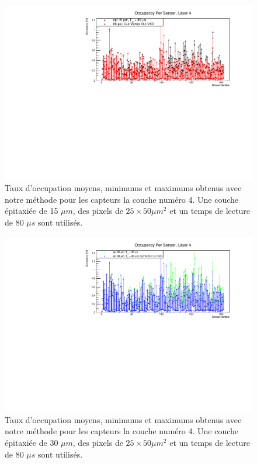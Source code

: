 \begin{appendices}
  \begin{figure}[!htb]
    \begin{center}
      \includegraphics[scale=0.80]{./figures/sensors_Readout_Time/resultOccupancyPerSensor/occupancyPerSensor_Layer4_epi_15um_Min_Max.pdf}
      \caption{Taux d'occupation moyens, minimums et maximums obtenus avec notre m\'ethode pour les capteurs la couche num\'ero 4. Une couche \'epitaxi\'ee de 15 $\mu m$, des pixels de $25 \times 50 \mu m^2$ et un temps de lecture de 80 $\mu s$ sont utilis\'es.}
      \label{fig:OccupancyLayer4_epi15um_Min_Max}
    \end{center}
  \end{figure}
  
  \begin{figure}[!htb]
    \begin{center}
      \includegraphics[scale=0.80]{./figures/sensors_Readout_Time/resultOccupancyPerSensor/occupancyPerSensor_Layer4_epi_30um_Min_Max.pdf}
      \caption{Taux d'occupation moyens, minimums et maximums obtenus avec notre m\'ethode pour les capteurs la couche num\'ero 4. Une couche \'epitaxi\'ee de 30 $\mu m$, des pixels de $25 \times 50 \mu m^2$ et un temps de lecture de 80 $\mu s$ sont utilis\'es.}
      \label{fig:OccupancyLayer4_epi30um_Min_Max}
    \end{center}
  \end{figure}


\end{appendices}
